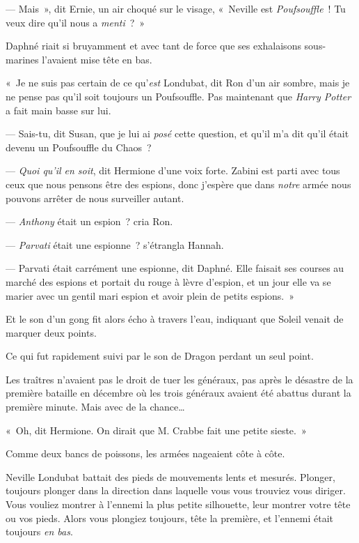 --- Mais~», dit Ernie, un air choqué sur le visage, «~Neville est \emph{Poufsouffle}~! Tu veux dire qu'il nous a \emph{menti}~?~»

Daphné riait si bruyamment et avec tant de force que ses exhalaisons sous-marines l'avaient mise tête en bas.

«~Je ne suis pas certain de ce qu'\emph{est} Londubat, dit Ron d'un air sombre, mais je ne pense pas qu'il soit toujours un Poufsouffle. Pas maintenant que \emph{Harry Potter} a fait main basse sur lui.

--- Sais-tu, dit Susan, que je lui ai \emph{posé} cette question, et qu'il m'a dit qu'il était devenu un Poufsouffle du Chaos~?

--- \emph{Quoi qu'il en soit}, dit Hermione d'une voix forte. Zabini est parti avec tous ceux que nous pensons être des espions, donc j'espère que dans \emph{notre} armée nous pouvons arrêter de nous surveiller autant.

--- \emph{Anthony} était un espion~? cria Ron.

--- \emph{Parvati} était une espionne~? s'étrangla Hannah.

--- Parvati était carrément une espionne, dit Daphné. Elle faisait ses courses au marché des espions et portait du rouge à lèvre d'espion, et un jour elle va se marier avec un gentil mari espion et avoir plein de petits espions.~»

Et le son d'un gong fit alors écho à travers l'eau, indiquant que Soleil venait de marquer deux points.

Ce qui fut rapidement suivi par le son de Dragon perdant un seul point.

Les traîtres n'avaient pas le droit de tuer les généraux, pas après le désastre de la première bataille en décembre où les trois généraux avaient été abattus durant la première minute. Mais avec de la chance…

«~Oh, dit Hermione. On dirait que M. Crabbe fait une petite sieste.~»

\later

Comme deux bancs de poissons, les armées nageaient côte à côte.

Neville Londubat battait des pieds de mouvements lents et mesurés. Plonger, toujours plonger dans la direction dans laquelle vous vous trouviez vous diriger. Vous vouliez montrer à l'ennemi la plus petite silhouette, leur montrer votre tête ou vos pieds. Alors vous plongiez toujours, tête la première, et l'ennemi était toujours \emph{en bas}.


